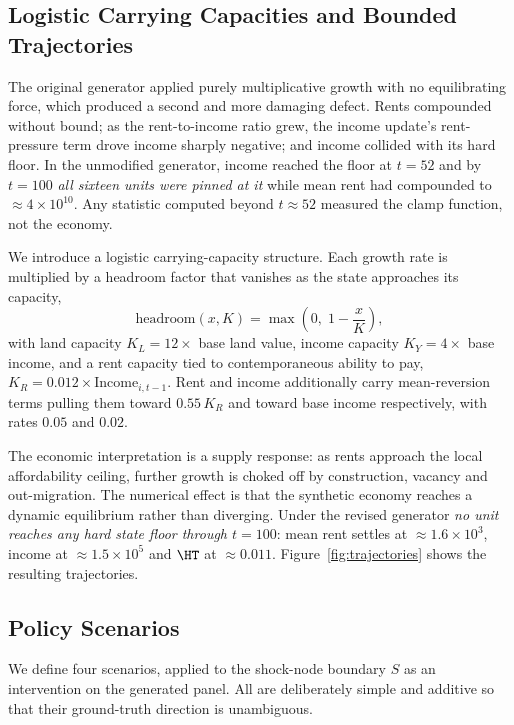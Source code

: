 \subsection{Logistic Carrying Capacities and Bounded Trajectories}

The original generator applied purely multiplicative growth with no
equilibrating force, which produced a second and more damaging defect. Rents
compounded without bound; as the rent-to-income ratio grew, the income update's
rent-pressure term drove income sharply negative; and income collided with its
hard floor. In the unmodified generator, income reached the floor at $t = 52$
and by $t = 100$ \emph{all sixteen units were pinned at it} while mean rent had
compounded to $\approx 4 \times 10^{10}$. Any statistic computed beyond
$t \approx 52$ measured the clamp function, not the economy.

We introduce a logistic carrying-capacity structure. Each growth rate is
multiplied by a headroom factor that vanishes as the state approaches its
capacity,
\begin{equation}
  \mathrm{headroom}(x, K) = \max\!\left(0,\; 1 - \frac{x}{K}\right),
  \label{eq:headroom}
\end{equation}
with land capacity $K_L = 12 \times$ base land value, income capacity
$K_Y = 4 \times$ base income, and a rent capacity tied to contemporaneous
ability to pay, $K_R = 0.012 \times \mathrm{Income}_{i,t-1}$. Rent and income
additionally carry mean-reversion terms pulling them toward
$0.55\,K_R$ and toward base income respectively, with rates $0.05$ and $0.02$.

The economic interpretation is a supply response: as rents approach the local
affordability ceiling, further growth is choked off by construction, vacancy
and out-migration. The numerical effect is that the synthetic economy reaches a
dynamic equilibrium rather than diverging. Under the revised generator
\emph{no unit reaches any hard state floor through $t = 100$}: mean rent
settles at $\approx 1.6 \times 10^{3}$, income at $\approx 1.5 \times 10^{5}$
and $\HT$ at $\approx 0.011$. Figure~\ref{fig:trajectories} shows the resulting
trajectories.

\subsection{Policy Scenarios}

We define four scenarios, applied to the shock-node boundary $S$ as an
intervention on the generated panel. All are deliberately simple and additive
so that their ground-truth direction is unambiguous.

